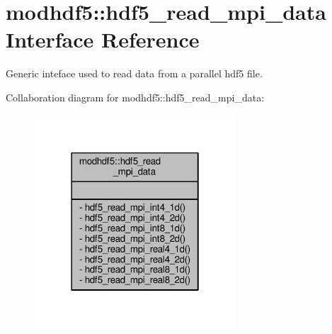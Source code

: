 \hypertarget{interfacemodhdf5_1_1hdf5__read__mpi__data}{}\section{modhdf5\+:\+:hdf5\+\_\+read\+\_\+mpi\+\_\+data Interface Reference}
\label{interfacemodhdf5_1_1hdf5__read__mpi__data}


Generic inteface used to read data from a parallel hdf5 file.  




Collaboration diagram for modhdf5\+:\+:hdf5\+\_\+read\+\_\+mpi\+\_\+data\+:\nopagebreak
\begin{figure}[H]
\begin{center}
\leavevmode
\includegraphics[width=214pt]{interfacemodhdf5_1_1hdf5__read__mpi__data__coll__graph}
\end{center}
\end{figure}

